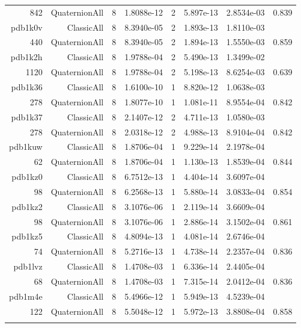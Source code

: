 \begin{xltabular}{\textwidth}{r|rcS[table-format=1.4e+2]cS[table-format=1.3e+2]S[table-format=1.4e+2]S[table-format=-1.3]}
842 & QuaternionAll & 8 & 1.8088e-12 & 2 & 5.897e-13 & 2.8534e-03 & 0.839\\  \addlinespace
pdb1k0v & ClassicAll & 8 & 8.3940e-05 & 2 & 1.893e-13 & 1.8110e-03 & \\
440 & QuaternionAll & 8 & 8.3940e-05 & 2 & 1.894e-13 & 1.5550e-03 & 0.859\\  \addlinespace
pdb1k2h & ClassicAll & 8 & 1.9788e-04 & 2 & 5.490e-13 & 1.3499e-02 & \\
1120 & QuaternionAll & 8 & 1.9788e-04 & 2 & 5.198e-13 & 8.6254e-03 & 0.639\\  \addlinespace
pdb1k36 & ClassicAll & 8 & 1.6100e-10 & 1 & 8.820e-12 & 1.0638e-03 & \\
278 & QuaternionAll & 8 & 1.8077e-10 & 1 & 1.081e-11 & 8.9554e-04 & 0.842\\  \addlinespace
pdb1k37 & ClassicAll & 8 & 2.1407e-12 & 2 & 4.711e-13 & 1.0580e-03 & \\
278 & QuaternionAll & 8 & 2.0318e-12 & 2 & 4.988e-13 & 8.9104e-04 & 0.842\\  \addlinespace
pdb1kuw & ClassicAll & 8 & 1.8706e-04 & 1 & 9.229e-14 & 2.1978e-04 & \\
62 & QuaternionAll & 8 & 1.8706e-04 & 1 & 1.130e-13 & 1.8539e-04 & 0.844\\  \addlinespace
pdb1kz0 & ClassicAll & 8 & 6.7512e-13 & 1 & 4.404e-14 & 3.6097e-04 & \\
98 & QuaternionAll & 8 & 6.2568e-13 & 1 & 5.880e-14 & 3.0833e-04 & 0.854\\  \addlinespace
pdb1kz2 & ClassicAll & 8 & 3.1076e-06 & 1 & 2.119e-14 & 3.6609e-04 & \\
98 & QuaternionAll & 8 & 3.1076e-06 & 1 & 2.886e-14 & 3.1502e-04 & 0.861\\  \addlinespace
pdb1kz5 & ClassicAll & 8 & 4.8094e-13 & 1 & 4.081e-14 & 2.6746e-04 & \\
74 & QuaternionAll & 8 & 5.2716e-13 & 1 & 4.738e-14 & 2.2357e-04 & 0.836\\  \addlinespace
pdb1lvz & ClassicAll & 8 & 1.4708e-03 & 1 & 6.336e-14 & 2.4405e-04 & \\
68 & QuaternionAll & 8 & 1.4708e-03 & 1 & 7.315e-14 & 2.0412e-04 & 0.836\\  \addlinespace
pdb1m4e & ClassicAll & 8 & 5.4966e-12 & 1 & 5.949e-13 & 4.5239e-04 & \\
122 & QuaternionAll & 8 & 5.5048e-12 & 1 & 5.972e-13 & 3.8808e-04 & 0.858\\  \addlinespace

\end{xltabular}
